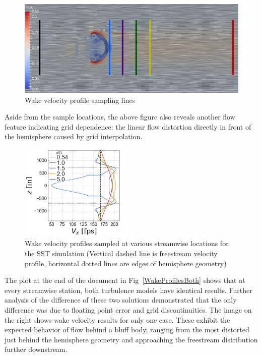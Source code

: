 \documentclass[]{aiaa-tc}%
\begin{document}
\begin{figure}[htb!]
\begin{center}
\includegraphics[width=\textwidth]{Images/SampleLines_color.png}
\caption{Wake velocity profile sampling lines}
\label{SampleLines}
\end{center}
\end{figure}

Aside from the sample locations, the above figure also reveals another flow feature indicating grid dependence: the linear flow distortion directly in front of the hemisphere caused by grid interpolation.

\begin{figure}[htb!]
\begin{center}
\includegraphics[width=0.45\textwidth]{Images/wakelines_sst_Vx.png}
\caption{Wake velocity profiles sampled at various streamwise locations for the SST simulation (Vertical dashed line is freestream velocity profile, horizontal dotted lines are edges of hemisphere geometry)}
\label{WakeProfiles}
\end{center}
\end{figure}

The plot at the end of the document in Fig~\ref{WakeProfilesBoth} shows that at every streamwise station, both turbulence models have identical results.  Further analysis of the difference of these two solutions demonstrated that the only difference was due to floating point error and grid discontinuities.  The image on the right shows wake velocity results for only one case.  These exhibit the expected behavior of flow behind a bluff body, ranging from the most distorted just behind the hemisphere geometry and approaching the freestream distribution further downstream.
\end{document}
